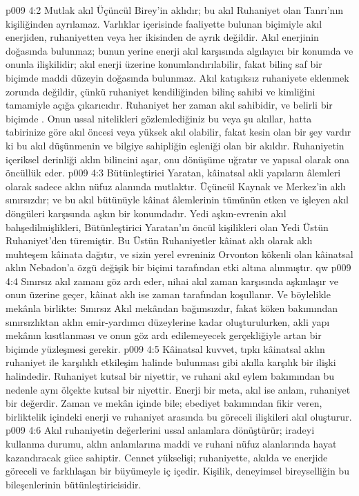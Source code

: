 \vs p009 4:2 Mutlak akıl Üçüncül Birey’in aklıdır; bu akıl Ruhaniyet olan Tanrı’nın kişiliğinden ayrılamaz. Varlıklar içerisinde faaliyette bulunan biçimiyle akıl enerjiden, ruhaniyetten veya her ikisinden de ayrık değildir. Akıl enerjinin doğasında bulunmaz; bunun yerine enerji akıl karşısında algılayıcı bir konumda ve onunla ilişkilidir; akıl enerji üzerine konumlandırılabilir, fakat bilinç saf bir biçimde maddi düzeyin doğasında bulunmaz. Akıl katışıksız ruhaniyete eklenmek zorunda değildir, çünkü ruhaniyet kendiliğinden bilinç sahibi ve kimliğini tamamiyle açığa çıkarıcıdır. Ruhaniyet her zaman akıl sahibidir, ve belirli bir biçimde . Onun ussal nitelikleri gözlemlediğiniz bu veya şu akıllar, hatta tabirinize göre akıl öncesi veya yüksek akıl olabilir, fakat kesin olan bir şey vardır ki bu akıl düşünmenin ve bilgiye sahipliğin eşleniği olan bir akıldır. Ruhaniyetin içeriksel derinliği aklın bilincini aşar, onu dönüşüme uğratır ve yapısal olarak ona öncüllük eder.
\vs p009 4:3 Bütünleştirici Yaratan, kâinatsal akli yapıların âlemleri olarak sadece aklın nüfuz alanında mutlaktır. Üçüncül Kaynak ve Merkez’in aklı sınırsızdır; ve bu akıl bütünüyle kâinat âlemlerinin tümünün etken ve işleyen akıl döngüleri karşısında aşkın bir konumdadır. Yedi aşkın\hyp{}evrenin akıl bahşedilmişlikleri, Bütünleştirici Yaratan’ın öncül kişilikleri olan Yedi Üstün Ruhaniyet’den türemiştir. Bu Üstün Ruhaniyetler kâinat aklı olarak aklı muhteşem kâinata dağıtır, ve sizin yerel evreniniz Orvonton kökenli olan kâinatsal aklın Nebadon’a özgü değişik bir biçimi tarafından etki altına alınmıştır. qw
\vs p009 4:4 Sınırsız akıl zamanı göz ardı eder, nihai akıl zaman karşısında aşkınlaşır ve onun üzerine geçer, kâinat aklı ise zaman tarafından koşullanır. Ve böylelikle mekânla birlikte: Sınırsız Akıl mekândan bağımsızdır, fakat köken bakımından sınırsızlıktan aklın emir\hyp{}yardımcı düzeylerine kadar oluşturulurken, akli yapı mekânın kısıtlanması ve onun göz ardı edilemeyecek gerçekliğiyle artan bir biçimde yüzleşmesi gerekir.
\vs p009 4:5 Kâinatsal kuvvet, tıpkı kâinatsal aklın ruhaniyet ile karşılıklı etkileşim halinde bulunması gibi akılla karşılık bir ilişki halindedir. Ruhaniyet kutsal bir niyettir, ve ruhani akıl eylem bakımından bu nedenle aynı ölçekte kutsal bir niyettir. Enerji bir meta, akıl ise anlam, ruhaniyet bir değerdir. Zaman ve mekân içinde bile; ebediyet bakımından fikir veren, birliktelik içindeki enerji ve ruhaniyet arasında bu göreceli ilişkileri akıl oluşturur.
\vs p009 4:6 Akıl ruhaniyetin değerlerini ussal anlamlara dönüştürür; iradeyi kullanma durumu, aklın anlamlarına maddi ve ruhani nüfuz alanlarında hayat kazandıracak güce sahiptir. Cennet yükselişi; ruhaniyette, akılda ve enerjide göreceli ve farklılaşan bir büyümeyle iç içedir. Kişilik, deneyimsel bireyselliğin bu bileşenlerinin bütünleştiricisidir.
